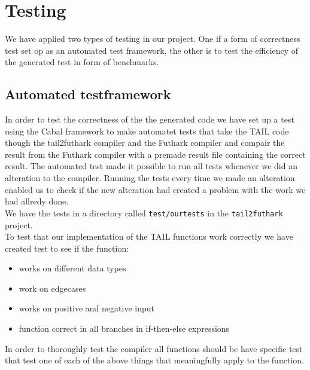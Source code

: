 \documentclass[11pt]{article}
\begin{document}


\section{Testing}
We have applied two types of testing in our project. One if a form of correctness test set op as an automated test
framework, the other is to test the efficiency of the generated test in form of benchmarks. 

\subsection{Automated testframework}
In order to test the correctness of the the generated code we have set up a test using the Cabal framework to make automatet tests that take the TAIL code though the tail2futhark compiler and the Futhark compiler and compair the result from the Futhark compiler with a premade result file containing the correct result. The automated test made it possible to run all tests whenever we did an alteration to the compiler. 
Running the tests every time we made an alteration enabled us to check if the new alteration had created a problem with the work we had allredy done. \\

We have the tests in a directory called {\tt test/ourtests} in the {\tt tail2futhark} project. \\

To test that our implementation of the TAIL functions work correctly we have created test to see if the function:
\begin{itemize}
\item works on different data types
\item work on edgecases
\item works on positive and negative input
\item function correct in all branches in if-then-else expressions
\end{itemize}
In order to thoroughly test the compiler all functions should be have specific test that test one of each of the above things
that meaningfully apply to the function. \\
\end{document}
